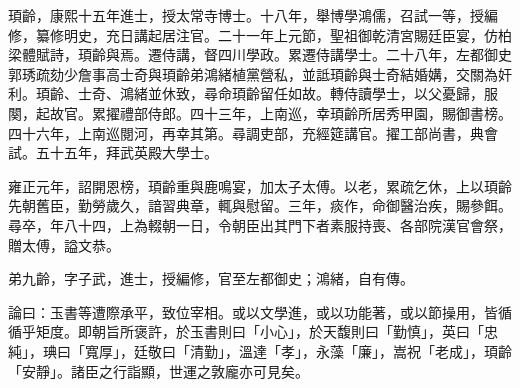 \begin{pinyinscope}
頊齡，康熙十五年進士，授太常寺博士。十八年，舉博學鴻儒，召試一等，授編修，纂修明史，充日講起居注官。二十一年上元節，聖祖御乾清宮賜廷臣宴，仿柏梁體賦詩，頊齡與焉。遷侍講，督四川學政。累遷侍講學士。二十八年，左都御史郭琇疏劾少詹事高士奇與頊齡弟鴻緒植黨營私，並詆頊齡與士奇結婚媾，交關為奸利。頊齡、士奇、鴻緒並休致，尋命頊齡留任如故。轉侍讀學士，以父憂歸，服闋，起故官。累擢禮部侍郎。四十三年，上南巡，幸頊齡所居秀甲園，賜御書榜。四十六年，上南巡閱河，再幸其第。尋調吏部，充經筵講官。擢工部尚書，典會試。五十五年，拜武英殿大學士。

雍正元年，詔開恩榜，頊齡重與鹿鳴宴，加太子太傅。以老，累疏乞休，上以頊齡先朝舊臣，勤勞歲久，諳習典章，輒與慰留。三年，痰作，命御醫治疾，賜參餌。尋卒，年八十四，上為輟朝一日，令朝臣出其門下者素服持喪、各部院漢官會祭，贈太傅，謚文恭。

弟九齡，字子武，進士，授編修，官至左都御史；鴻緒，自有傳。

論曰：玉書等遭際承平，致位宰相。或以文學進，或以功能著，或以節操用，皆循循乎矩度。即朝旨所褒許，於玉書則曰「小心」，於天馥則曰「勤慎」，英曰「忠純」，琠曰「寬厚」，廷敬曰「清勤」，溫達「孝」，永藻「廉」，嵩祝「老成」，頊齡「安靜」。諸臣之行詣顯，世運之敦龐亦可見矣。


\end{pinyinscope}